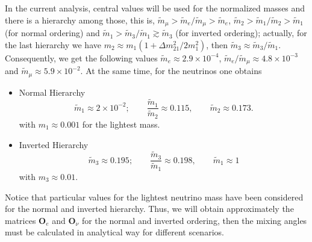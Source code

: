 \documentclass[aps,prd,groupaddress,floatfix,tighten,nofootinbib,showpacs,amsfonts,superscriptaddress]{revtex4-2}
\begin{document}
In the current analysis, central values will be used for the normalized masses and there is a hierarchy among those, this is,  $\tilde{m}_{\mu}>\tilde{m}_{e}/ \tilde{m}_{\mu}>\tilde{m}_{e}$, $\tilde{m}_{2}>\tilde{m}_{1}/ \tilde{m}_{2}>\tilde{m}_{1}$ (for normal ordering) and $\tilde{m}_{1}>\tilde{m}_{3}/ \tilde{m}_{1}\gtrsim\tilde{m}_{3}$ (for inverted ordering); actually, for the last hierarchy we have $m_{2}\approx m_{1}(1+ \Delta m^{2}_{21}/2m^{2}_{1})$, then $\tilde{m}_{3}\approx \tilde{m}_{3}/ \tilde{m}_{1}$. Consequently, we get the following values
$\tilde{m}_{e}\approx 2.9\times 10^{-4}$, $\tilde{m}_{e}/ \tilde{m}_{\mu}\approx 4.8\times 10^{-3}$ and $\tilde{m}_{\mu} \approx 5.9\times 10^{-2}$. At the same time, for the neutrinos one obtains
\begin{itemize}
	\item Normal Hierarchy
	\begin{equation}\label{normasses}
\tilde{m}_{1}\approx 2\times 10^{-2};\qquad \frac{\tilde{m}_{1}}{\tilde{m}_{2}}\approx 0.115,\qquad \tilde{m}_{2}\approx 0.173. 
\end{equation}
with $m_{1}\approx 0.001$ for the lightest mass.

\item Inverted Hierarchy
\begin{equation}
\tilde{m}_{3}\approx 0.195;\qquad \frac{\tilde{m}_{3}}{\tilde{m}_{1}}\approx 0.198,\qquad \tilde{m}_{1}\approx 1 
\end{equation}
with $m_{3}\approx 0.01$. 
\end{itemize}
 
Notice that particular values for the lightest neutrino mass have been considered for the normal and inverted hierarchy. Thus, we will obtain approximately the matrices $\mathbf{O}_{e}$ and $\mathbf{O}_{\nu}$ for the normal and inverted ordering, then the mixing angles must be calculated in analytical way for different scenarios.
\end{document}
